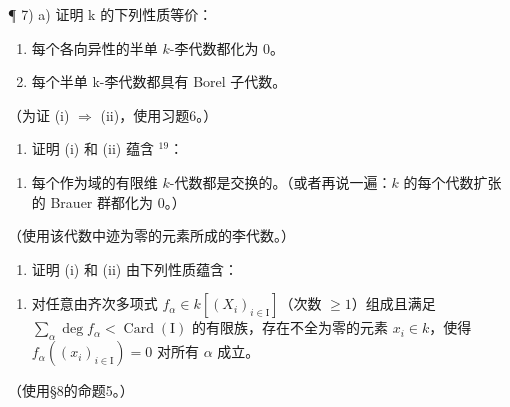 ¶ 7) a) 证明 k 的下列性质等价：

\begin{enumerate}
\def\labelenumi{(\roman{enumi})}
\item
  每个各向异性的半单 \(k\)-李代数都化为 0。
\item
  每个半单 k-李代数都具有 Borel 子代数。
\end{enumerate}

（为证 (i) \(\Longrightarrow\) (ii)，使用习题6。）

\begin{enumerate}
\def\labelenumi{\alph{enumi})}
\setcounter{enumi}{1}
\tightlist
\item
  证明 (i) 和 (ii) 蕴含 \(^{19}\)：
\end{enumerate}

\begin{enumerate}
\def\labelenumi{(\roman{enumi})}
\setcounter{enumi}{2}
\tightlist
\item
  每个作为域的有限维 \(k\)-代数都是交换的。（或者再说一遍：\(k\) 的每个代数扩张的 Brauer 群都化为 0。）
\end{enumerate}

（使用该代数中迹为零的元素所成的李代数。）

\begin{enumerate}
\def\labelenumi{\alph{enumi})}
\setcounter{enumi}{2}
\tightlist
\item
  证明 (i) 和 (ii) 由下列性质蕴含：
\end{enumerate}

\begin{enumerate}
\def\labelenumi{(\roman{enumi})}
\setcounter{enumi}{3}
\tightlist
\item
  对任意由齐次多项式 \(f_{\alpha} \in k[(X_i)_{i \in \mathrm{I}}]\)（次数 \(\geq 1\)）组成且满足 \(\sum_{\alpha} \deg f_{\alpha} < \operatorname{Card}(\mathrm{I})\) 的有限族，存在不全为零的元素 \(x_i \in k\)，使得 \(f_{\alpha}((x_i)_{i \in \mathrm{I}}) = 0\) 对所有 \(\alpha\) 成立。
\end{enumerate}

（使用§8的命题5。）

